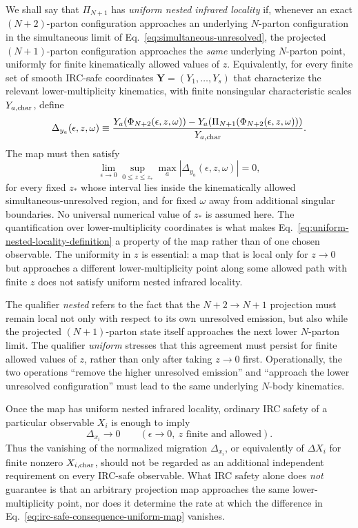 \documentclass[11pt]{article}
\newcommand{\Ph}{\Phi}
\begin{document}
We shall say that \(\Pi_{N+1}\) has \emph{uniform nested infrared locality} if, whenever an exact
\((N+2)\)-parton configuration approaches an underlying \(N\)-parton configuration in the simultaneous
limit of Eq.~\eqref{eq:simultaneous-unresolved}, the projected \((N+1)\)-parton configuration approaches the
\emph{same} underlying \(N\)-parton point, uniformly for finite kinematically allowed values of \(z\).
Equivalently, for every finite set of smooth IRC-safe coordinates
\(\mathbf Y=(Y_1,\ldots,Y_s)\) that characterize the relevant lower-multiplicity kinematics, with finite
nonsingular characteristic scales \(Y_{a,\rm char}\), define
\[
\Delta_{y_a}(\epsilon,z,\omega)
\equiv
\frac{
Y_a(\Ph_{N+2}(\epsilon,z,\omega))
-Y_a(\Pi_{N+1}(\Ph_{N+2}(\epsilon,z,\omega)))
}{Y_{a,\rm char}}.
\]
The map must then satisfy
\begin{equation}
\lim_{\epsilon\to0}
\sup_{0\le z\le z_*}
\max_a
\left|\Delta_{y_a}(\epsilon,z,\omega)\right|
=0,
\label{eq:uniform-nested-locality-definition}
\end{equation}
for every fixed \(z_*\) whose interval lies inside the kinematically allowed simultaneous-unresolved region,
and for fixed \(\omega\) away from additional singular boundaries. No universal numerical value of
\(z_*\) is assumed here. The quantification over lower-multiplicity coordinates is what makes
Eq.~\eqref{eq:uniform-nested-locality-definition} a property of the map rather than of one chosen observable.
The uniformity in \(z\) is essential: a map that is local only for \(z\to0\) but approaches a different
lower-multiplicity point along some allowed path with finite \(z\) does not satisfy uniform nested infrared
locality.

The qualifier \emph{nested} refers to the fact that the \(N+2\to N+1\) projection must remain local not only
with respect to its own unresolved emission, but also while the projected \((N+1)\)-parton state itself
approaches the next lower \(N\)-parton limit. The qualifier \emph{uniform} stresses that this agreement must
persist for finite allowed values of \(z\), rather than only after taking \(z\to0\) first. Operationally, the
two operations ``remove the higher unresolved emission'' and ``approach the lower unresolved configuration''
must lead to the same underlying \(N\)-body kinematics.

Once the map has uniform nested infrared locality, ordinary IRC safety of a particular observable \(X_i\) is
enough to imply
\begin{equation}
\Delta_{x_i}
\longrightarrow0
\qquad
(\epsilon\to0,\ z\text{ finite and allowed}).
\label{eq:irc-safe-consequence-uniform-map}
\end{equation}
Thus the vanishing of the normalized migration \(\Delta_{x_i}\), or equivalently of \(\Delta X_i\) for
finite nonzero \(X_{i,\rm char}\), should not be regarded as an additional independent requirement on every
IRC-safe observable. What IRC safety alone does \emph{not} guarantee is
that an arbitrary projection map approaches the same lower-multiplicity point, nor does it determine the
rate at which the difference in Eq.~\eqref{eq:irc-safe-consequence-uniform-map} vanishes.
\end{document}
